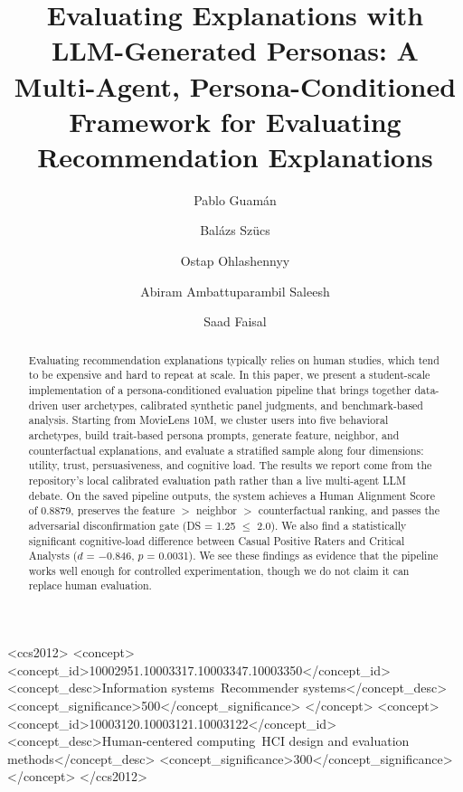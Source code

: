 \documentclass[sigconf,nonacm]{acmart}
\begin{document}
\title{Evaluating Explanations with LLM-Generated Personas: A Multi-Agent, Persona-Conditioned Framework for Evaluating Recommendation Explanations}

\author{Pablo Guam\'an}
\author{Bal\'azs Sz\"ucs}
\author{Ostap Ohlashennyy}
\author{Abiram Ambattuparambil Saleesh}
\author{Saad Faisal}
\renewcommand{\shortauthors}{Guam\'an et al.}

\begin{abstract}
Evaluating recommendation explanations typically relies on human studies, which tend to be expensive and hard to repeat at scale. In this paper, we present a student-scale implementation of a persona-conditioned evaluation pipeline that brings together data-driven user archetypes, calibrated synthetic panel judgments, and benchmark-based analysis. Starting from MovieLens 10M, we cluster users into five behavioral archetypes, build trait-based persona prompts, generate feature, neighbor, and counterfactual explanations, and evaluate a stratified sample along four dimensions: utility, trust, persuasiveness, and cognitive load. The results we report come from the repository's local calibrated evaluation path rather than a live multi-agent LLM debate. On the saved pipeline outputs, the system achieves a Human Alignment Score of 0.8879, preserves the feature $>$ neighbor $>$ counterfactual ranking, and passes the adversarial disconfirmation gate (DS = 1.25 $\leq$ 2.0). We also find a statistically significant cognitive-load difference between Casual Positive Raters and Critical Analysts ($d$ = $-$0.846, $p$ = 0.0031). We see these findings as evidence that the pipeline works well enough for controlled experimentation, though we do not claim it can replace human evaluation.
\end{abstract}

\begin{CCSXML}
<ccs2012>
<concept>
<concept_id>10002951.10003317.10003347.10003350</concept_id>
<concept_desc>Information systems~Recommender systems</concept_desc>
<concept_significance>500</concept_significance>
</concept>
<concept>
<concept_id>10003120.10003121.10003122</concept_id>
<concept_desc>Human-centered computing~HCI design and evaluation methods</concept_desc>
<concept_significance>300</concept_significance>
</concept>
</ccs2012>
\end{CCSXML}
\end{document}
